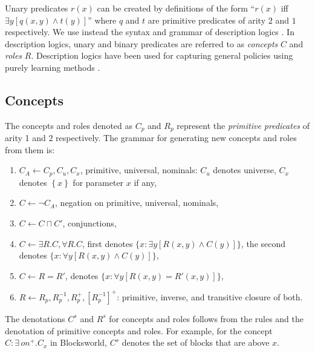 \documentclass[letterpaper]{article} %
\newcommand{\set}[1]{\ensuremath{\left\{#1 \right\}}}
\begin{document}
Unary predicates $r(x)$ can be created by definitions of the form ``$r(x)$ iff $\exists y[q(x,y) \land t(y)]$''
where $q$ and $t$ are  primitive  predicates of arity $2$ and $1$ respectively.
We  use   instead the syntax and  grammar
of  description logics \cite{dl-handbook}.  In description logics, unary and binary predicates
are referred to as \emph{concepts} $C$  and \emph{roles} $R$. Description logics  have been used 
for capturing general policies using purely learning methods \cite{martin-geffner:generalized,fern:bias}.

\subsection{Concepts}

The concepts and roles denoted as $C_p$ and $R_p$ represent the \emph{primitive predicates} of arity 1 and 2 respectively.
The grammar for generating new concepts and roles from them is:

\begin{enumerate}[{\small$\bullet$}]
  \item $C_A \leftarrow C_p, C_u, C_x$,  primitive, universal, nominals: $C_u$ denotes  universe,
   $C_x$ denotes $\set{x}$ for parameter $x$ if any,
  \item $C \leftarrow \neg C_A$, negation on primitive, universal, nominals,
  \item $C \leftarrow C \sqcap C'$, conjunctions,
  \item $C \leftarrow \exists R.C,\forall R.C$, first denotes $\{x:\!\exists y[R(x,y) \land C(y)]\}$, %
    the second denotes $\{x:\forall y[R(x,y)\land C(y)]\}$, %
  \item $C \leftarrow R=R'$, denotes $\{ x : \forall y[R(x,y)=R'(x,y)]\}$, %
  \item $R \leftarrow R_p, R_p^{-1}, R_p^+, [R_p^{-1}]^+$: primitive, inverse, and transitive closure of both.
 \end{enumerate}

The denotations $C^s$ and $R^s$ for concepts and roles follows
from the rules and the denotation of primitive concepts and roles.
For example, for the concept $C: \exists\, on^+ . C_x$ in Blocksworld,
$C^s$ denotes the set of blocks that are above $x$.
\end{document}
